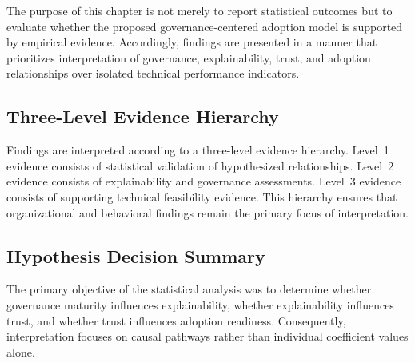 \noindent The purpose of this chapter is not merely to report statistical outcomes but to evaluate whether the proposed governance-centered adoption model is supported by empirical evidence. Accordingly, findings are presented in a manner that prioritizes interpretation of governance, explainability, trust, and adoption relationships over isolated technical performance indicators.


\subsection{Three-Level Evidence Hierarchy}
\label{sec:evidence_hierarchy}

\noindent Findings are interpreted according to a three-level evidence hierarchy. Level~1 evidence consists of statistical validation of hypothesized relationships. Level~2 evidence consists of explainability and governance assessments. Level~3 evidence consists of supporting technical feasibility evidence. This hierarchy ensures that organizational and behavioral findings remain the primary focus of interpretation.


\subsection{Hypothesis Decision Summary}
\label{sec:hypothesis_decision_summary}

\noindent The primary objective of the statistical analysis was to determine whether governance maturity influences explainability, whether explainability influences trust, and whether trust influences adoption readiness. Consequently, interpretation focuses on causal pathways rather than individual coefficient values alone.

